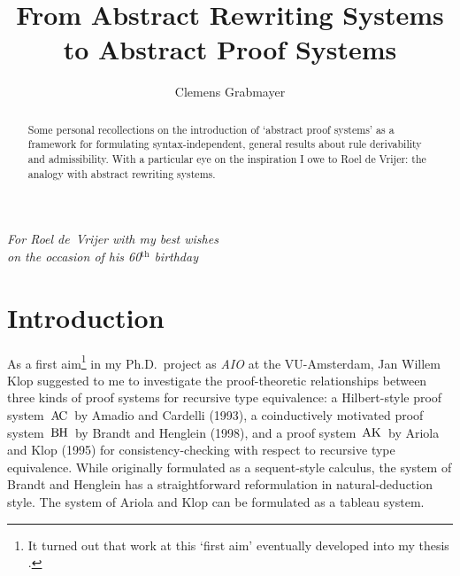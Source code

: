 \documentclass[envcountsame,runningheads]{llncs}
\newcommand{\AKeq}{$\text{A\hspace{-0.1pt}K}$} \newcommand{\ACeq}{$\text{A\hspace{-1.05pt}C}$} \newcommand{\BHeq}{$\text{B\hspace{-0.45pt}H}$}
\begin{document}
 

\title{From Abstract Rewriting Systems\\ to Abstract Proof Systems}
   
\author{Clemens Grabmayer}
\maketitle




\begin{abstract}
Some personal recollections on the introduction of `abstract
  proof systems' as a framework for formulating syntax-independent,
  general results about rule derivability and admissibility.
  With a particular eye on the inspiration I owe to Roel de Vrijer:
the analogy with abstract rewriting systems.
\end{abstract}



\begin{flushright}
\emph{For Roel de~Vrijer with my best wishes\\
        on the occasion of his 60$^{\text{th}}$ birthday
} 
\end{flushright}


\section{Introduction}
  \label{sec:intro}



As a first aim\footnote{It turned out that work at this `first aim' eventually
            developed into my thesis \cite{grab:2005}.}
in my Ph.D.~project as \emph{AIO} at the VU-Amsterdam,
Jan Willem Klop suggested to me to investigate the 
proof-theoretic relationships between three kinds of proof systems for 
recursive type equivalence: 
a Hilbert-style proof system~\ACeq\ by Amadio and Cardelli (1993),
a coinductively motivated proof system~\BHeq\ by Brandt and Henglein (1998),
and a proof system~\AKeq\ by Ariola and Klop (1995)
for consistency-checking with respect to recursive type equivalence.
While originally formulated as a sequent-style calculus, the system of Brandt
and Henglein has a straightforward reformulation in natural-deduction style. 
The system of Ariola and Klop can be formulated as a tableau system. 
\end{document}
